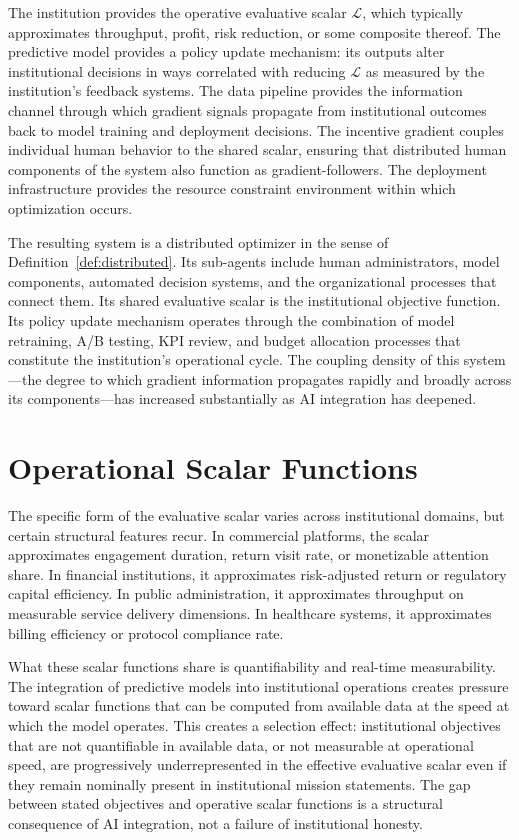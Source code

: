 \documentclass[12pt, oneside]{book}
\theoremstyle{plain}
\theoremstyle{definition}
\theoremstyle{remark}
\theoremstyle{definition}
\begin{document}
The institution provides the operative evaluative scalar $\mathcal{L}$, which
typically approximates throughput, profit, risk reduction, or some composite thereof.
The predictive model provides a policy update mechanism: its outputs alter institutional
decisions in ways correlated with reducing $\mathcal{L}$ as measured by the
institution's feedback systems. The data pipeline provides the information channel
through which gradient signals propagate from institutional outcomes back to model
training and deployment decisions. The incentive gradient couples individual human
behavior to the shared scalar, ensuring that distributed human components of the
system also function as gradient-followers. The deployment infrastructure provides
the resource constraint environment within which optimization occurs.

The resulting system is a distributed optimizer in the sense of
Definition~\ref{def:distributed}. Its sub-agents include human administrators,
model components, automated decision systems, and the organizational processes that
connect them. Its shared evaluative scalar is the institutional objective function.
Its policy update mechanism operates through the combination of model retraining,
A/B testing, KPI review, and budget allocation processes that constitute the
institution's operational cycle. The coupling density of this system---the degree
to which gradient information propagates rapidly and broadly across its
components---has increased substantially as AI integration has deepened.

\section{Operational Scalar Functions}

The specific form of the evaluative scalar varies across institutional domains, but
certain structural features recur. In commercial platforms, the scalar approximates
engagement duration, return visit rate, or monetizable attention share. In financial
institutions, it approximates risk-adjusted return or regulatory capital efficiency.
In public administration, it approximates throughput on measurable service delivery
dimensions. In healthcare systems, it approximates billing efficiency or protocol
compliance rate.

What these scalar functions share is quantifiability and real-time measurability.
The integration of predictive models into institutional operations creates pressure
toward scalar functions that can be computed from available data at the speed at
which the model operates. This creates a selection effect: institutional objectives
that are not quantifiable in available data, or not measurable at operational speed,
are progressively underrepresented in the effective evaluative scalar even if they
remain nominally present in institutional mission statements. The gap between stated
objectives and operative scalar functions is a structural consequence of AI integration,
not a failure of institutional honesty.
\end{document}
